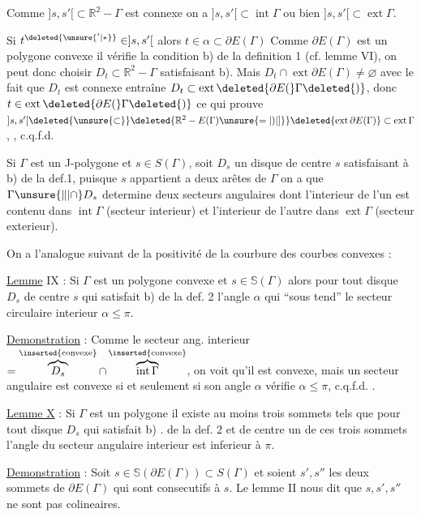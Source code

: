 Comme $]s,s'[\subset\mathbb{R}^{2}-\Gamma$ est connexe on a $]s,s'[\subset\operatorname{int}\Gamma$ ou bien $]s,s'[\subset\operatorname{ext}\Gamma$.

Si $t^{\deleted{\unsure{'|*}}}\in ]s,s'[$ alors $t\in\alpha\subset\partial E(\Gamma)$  Comme $\partial E(\Gamma)$ est un polygone convexe il vérifie la condition b) de la definition 1 (cf. lemme VI), on peut donc choisir $D_t\subset\mathbb{R}^{2}-\Gamma$ satisfaisant b). Mais $D_t\cap\operatorname{ext}\partial E(\Gamma)\ne\varnothing$  avec le fait que $D_t$ est connexe entraîne $D_t\subset\operatorname{ext}\deleted{\partial E(}\Gamma\deleted{)}$, donc $t\in\operatorname{ext}\deleted{\partial E(}\Gamma\deleted{)}$ ce qui prouve  $]s,s'[\deleted{\unsure{\subset}}\deleted{\mathbb{R}^{2}-E(\Gamma)\unsure{=|)|]}}\deleted{\operatorname{ext}\partial E(\Gamma)}\subset\operatorname{ext}\Gamma$, , c.q.f.d.

Si $\Gamma$ est un J-polygone et $s\in S(\Gamma)$, soit $D_s$ un disque de centre $s$ satisfaisant à b) de la def.1, puisque $s$ appartient a deux arêtes de $\Gamma$ on a que $\Gamma\unsure{\Vert|\cap}D_s$ determine deux secteurs angulaires dont l'interieur de l'un est contenu dans $\operatorname{int}\Gamma$ (secteur interieur) et l'interieur de l'autre dans $\operatorname{ext}\Gamma$ (secteur exterieur).

\margin{$\unsure{\cdot|\bullet}$}
On a   l'analogue suivant de la positivité de la courbure des courbes  convexes :

\uline{Lemme} IX : Si $\Gamma$ est un polygone convexe et $s\in\mathbb{S}(\Gamma)$ alors pour tout disque $D_s$ de centre $s$ qui satisfait b) de la def. 2 l'angle $\alpha$ qui ``sous tend'' le secteur circulaire interieur  $\alpha\le\pi$.

\uline{Demonstration} : Comme le secteur ang. interieur $=\overbrace{D_s}^{\inserted{\text{convexe}}}\cap\overbrace{\operatorname{int}\Gamma}^{\inserted{\text{convexe}}}$, on voit qu'il est convexe, mais un secteur angulaire est convexe si et seulement si son angle $\alpha$ vérifie $\alpha\le\pi$, c.q.f.d. .


\uline{Lemme X} : Si $\Gamma$ est un polygone il existe au moins trois sommets tels que pour tout disque $D_s$ qui satisfait b) . de la def. 2 et de centre un de ces trois sommets l'angle du secteur angulaire interieur est inferieur à $\pi$.

\uline{Demonstration} : Soit $s\in\mathbb{S}(\partial E(\Gamma))\subset S(\Gamma)$ et soient $s',s''$ les deux sommets de $\partial E(\Gamma)$ qui sont consecutifs à $s$. Le lemme II nous dit que $s,s',s''$ ne sont pas colineaires.
